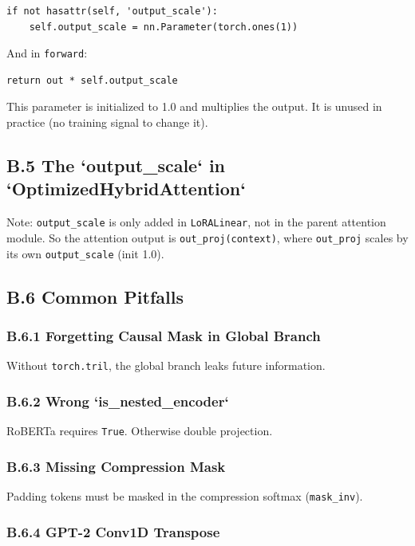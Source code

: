 \begin{lstlisting}
if not hasattr(self, 'output_scale'):
    self.output_scale = nn.Parameter(torch.ones(1))
\end{lstlisting}

And in \texttt{forward}:

\begin{lstlisting}
return out * self.output_scale
\end{lstlisting}

This parameter is initialized to 1.0 and multiplies the output. It is 
unused in practice (no training signal to change it).

\subsection{B.5 The `output\_scale` in `OptimizedHybridAttention`}

Note: \texttt{output\_scale} is only added in \texttt{LoRALinear}, not in the parent 
attention module. So the attention output is \texttt{out\_proj(context)}, where 
\texttt{out\_proj} scales by its own \texttt{output\_scale} (init 1.0).

\subsection{B.6 Common Pitfalls}

\subsubsection{B.6.1 Forgetting Causal Mask in Global Branch}

Without \texttt{torch.tril}, the global branch leaks future information.

\subsubsection{B.6.2 Wrong `is\_nested\_encoder`}

RoBERTa requires \texttt{True}. Otherwise double projection.

\subsubsection{B.6.3 Missing Compression Mask}

Padding tokens must be masked in the compression softmax (\texttt{mask\_inv}).

\subsubsection{B.6.4 GPT-2 Conv1D Transpose}

